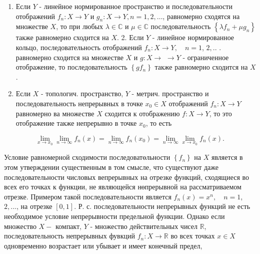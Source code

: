 \documentclass[10pt]{article}
\begin{document}
\begin{enumerate}

  \item Если $Y$ - линейное нормированное пространство и последовательности отображений $f_{n}: X \rightarrow Y$ и $g_{n}: X \rightarrow Y, n=1,2, \ldots$, равномерно сходятся на множестве $X$, то при любых $\lambda \in \mathbb{C}$ и $\mu \in \mathbb{C}$ последовательность $\left\{\lambda f_{n}+\mu g_{n}\right\}$ также равномерно сходится на $X$. 2. Если $Y$ - линейное нормированное кольцо, последовательность отображений $f_{n}: X \rightarrow Y, \quad n=1$, $2, .$. . равномерно сходится на множестве $X$ и $g: X \rightarrow$ $\rightarrow Y$ - ограниченное отображение, то последовательность $\left\{g f_{n}\right\}$ также равномерно сходится на $X$.



  \item Если $X$ - топологич. пространство, $Y$ - метрич. пространство и последовательность непрерывных в точке $x_{0} \in X$ отображений $f_{n}: X \rightarrow Y$ равномерно ва множестве $X$ сходится к отображению $f: X \rightarrow Y$, то это отображение также непрерывно в точке $x_{0}$, то есть



\end{enumerate}



\[

\lim _{x \rightarrow x_{0}} \lim _{n \rightarrow \infty} f_{n}(x)=\lim _{n \rightarrow \infty} f_{n}\left(x_{0}\right)=\lim _{n \rightarrow \infty} \lim _{x \rightarrow x_{0}} f_{n}(x) .

\]



Условие равномерной сходимости последоватөльности $\left\{f_{n}\right\}$ на $X$ является в этом утверждении существенным в том смысле, что существуют даже последовательности числовых вепрерывных на отрезке функций, сходящиеся во всех его точках к функции, не являющейся нөпрерывной на рассматриваемом отрезке. Примером такой последовательности является $f_{n}(x)=x^{n}, \quad n=1$, $2, . . .$, на отрезке $[0,1]$. Р. с. последовательности непрерывных функций не есть необходимое условие непрерывности предельной функции. Однако если множество $X-$ компакт, $Y$ - множество действительных чисел $\mathbb{R}$, последовательность непрерывных фувкций $f_{n}: X \rightarrow \mathbb{R}$ во всех точках $x \in X$ одновременно возрастает или убывает и имеет конечный предел,
\end{document}
